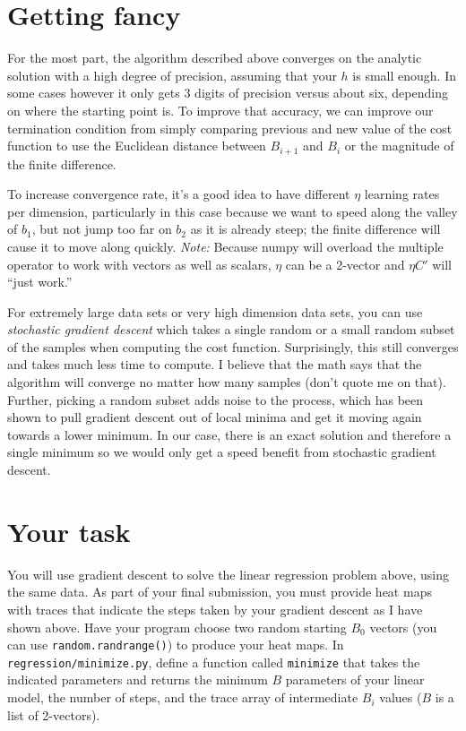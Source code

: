 \documentclass[titlepage]{tufte-book}
\newcounter{problem}
\begin{document}
\begin{fullwidth}
\section{Getting fancy}

For the most part, the algorithm described above converges on the analytic solution with a high degree of precision, assuming that your $h$ is small enough. In some cases however it only gets 3 digits of precision versus about six, depending on where the starting point is. To improve that accuracy, we can improve our termination condition from simply comparing previous and new value of the cost function to use the Euclidean distance between $B_{i+1}$ and $B_i$ or the magnitude of the finite difference. 

To increase convergence rate, it's a good idea to have different $\eta$ learning rates per dimension, particularly in this case because we want to speed along the valley of $b_1$, but not jump too far on $b_2$ as it is already steep; the finite difference will cause it to move along quickly. {\em Note:} Because numpy will overload the {\tt *} multiple operator to work with vectors as well as scalars, $\eta$ can be a 2-vector and $\eta C'$ will ``just work.''

For extremely large data sets or very high dimension data sets, you can use {\em stochastic gradient descent} which takes a single random or a small random subset of the samples when computing the cost function. Surprisingly, this still converges and takes much less time to compute. I believe that the math says that the algorithm will converge no matter how many samples (don't quote me on that). Further, picking a random subset adds noise to the process, which has been shown to pull gradient descent out of local minima and get it moving again towards a lower minimum. In our case, there is an exact solution and therefore a single minimum so we would only get a speed benefit from stochastic gradient descent.

\section{Your task}

You will use gradient descent to solve the linear regression problem above, using the same data. As part of your final submission, you must provide heat maps with traces that indicate the steps taken by your gradient descent as I have shown above.  Have your program choose two random starting $B_0$ vectors (you can use {\tt random.randrange()}) to produce your heat maps.   In {\tt regression/minimize.py}, define a function called {\tt minimize} that takes the indicated parameters and returns the minimum $B$ parameters of your linear model, the number of steps, and the trace array of intermediate $B_i$ values ($B$ is a list of 2-vectors).


\end{fullwidth}
\end{document}
